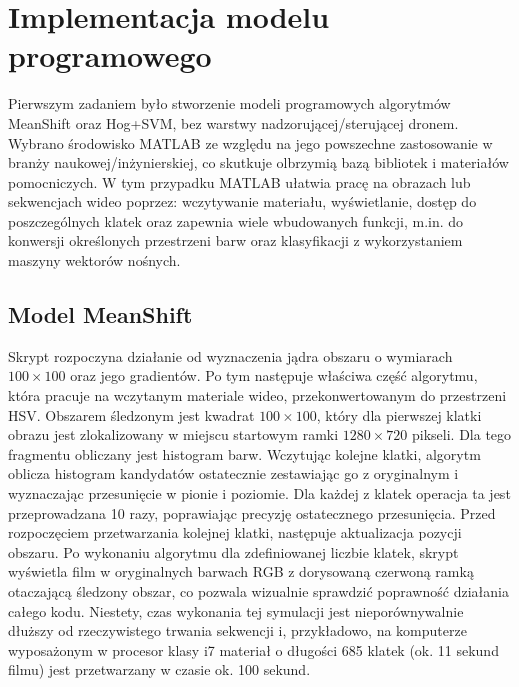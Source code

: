 \chapter{Implementacja modelu programowego}

Pierwszym zadaniem było stworzenie modeli programowych algorytmów MeanShift oraz Hog+SVM, bez warstwy nadzorującej/sterującej dronem. 
Wybrano środowisko MATLAB ze względu na jego powszechne zastosowanie w branży naukowej/inżynierskiej, co skutkuje olbrzymią bazą bibliotek i materiałów pomocniczych. 
W tym przypadku MATLAB ułatwia pracę na obrazach lub sekwencjach wideo poprzez: wczytywanie materiału, wyświetlanie, dostęp do poszczególnych klatek oraz zapewnia wiele wbudowanych funkcji, m.in. do konwersji określonych przestrzeni barw oraz klasyfikacji z wykorzystaniem maszyny wektorów nośnych. %

\section{Model MeanShift}

Skrypt rozpoczyna działanie od wyznaczenia jądra obszaru o wymiarach $100 \times 100$ oraz jego gradientów. %
Po tym następuje właściwa część algorytmu, która pracuje na wczytanym materiale wideo, przekonwertowanym do przestrzeni HSV. 
Obszarem śledzonym jest kwadrat $100\times 100$, który dla pierwszej klatki obrazu jest zlokalizowany w miejscu startowym ramki $1280\times 720$ pikseli. %
Dla tego fragmentu obliczany jest histogram barw. 
Wczytując kolejne klatki, algorytm oblicza histogram kandydatów ostatecznie zestawiając go z oryginalnym i wyznaczając przesunięcie w pionie i poziomie. %
Dla każdej z klatek operacja ta jest przeprowadzana 10 razy, poprawiając precyzję ostatecznego przesunięcia. 
Przed rozpoczęciem przetwarzania kolejnej klatki, następuje aktualizacja pozycji obszaru. %
Po wykonaniu algorytmu dla zdefiniowanej liczbie klatek, skrypt wyświetla film w oryginalnych barwach RGB z dorysowaną czerwoną ramką otaczającą śledzony obszar, co pozwala wizualnie sprawdzić poprawność działania całego kodu. 
Niestety, czas wykonania tej symulacji jest nieporównywalnie dłuższy od rzeczywistego trwania sekwencji i, przykładowo, na komputerze wyposażonym w procesor klasy i7 materiał o długości 685 klatek (ok. 11 sekund filmu) jest przetwarzany w czasie ok. 100 sekund.

